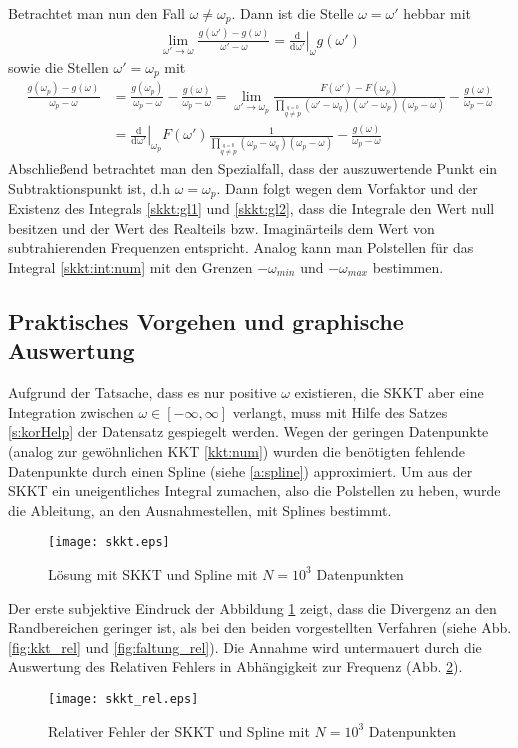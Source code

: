 Betrachtet man nun den Fall $\omega \neq \omega_p$. Dann ist die Stelle $\omega = \omega'$ hebbar mit
\begin{align}
\lim_{\omega' \rightarrow \omega}  \frac{g(\omega') - g(\omega)}{\omega' - \omega} =  \left. \frac{\mathrm{d}}{\mathrm{d\omega'}}\right|_{\omega} g(\omega') 
\end{align}
sowie die Stellen $\omega' = \omega_p$ mit
\begin{align}
	 \frac{g(\omega_p) - g(\omega)}{\omega_p - \omega} &= \frac{g(\omega_p)}{\omega_p - \omega} - \frac{g(\omega)}{\omega_p - \omega} =  \lim_{\omega' \rightarrow \omega_p} \frac{F(\omega') - F(\omega_p)}{\prod_{\stackrel{q = 0}{q \neq p}} (\omega' - \omega_q) (\omega' - \omega_p) (\omega_p - \omega)} - \frac{g(\omega)}{\omega_p - \omega}\\
	 &= \left.\frac{\mathrm{d}}{\mathrm{d\omega'}} \right|_{\omega_p} F(\omega') \frac{1}{\prod_{\stackrel{q = 0}{q \neq p}} (\omega_p - \omega_q) (\omega_p - \omega)} - \frac{g(\omega)}{\omega_p - \omega}
\end{align}
Abschließend betrachtet man den Spezialfall, dass der auszuwertende Punkt ein Subtraktionspunkt ist, d.h $\omega  = \omega_p$.
Dann folgt wegen dem Vorfaktor und der Existenz des Integrals \ref{skkt:gl1} und \ref{skkt:gl2}, dass die Integrale den Wert null besitzen und der Wert des Realteils bzw. Imaginärteils dem Wert von subtrahierenden Frequenzen entspricht. 
Analog kann man Polstellen für das Integral \ref{skkt:int:num} mit den Grenzen $-\omega_{min}$ und $-\omega_{max}$ bestimmen.
\subsection{Praktisches Vorgehen und graphische Auswertung}\label{num:skkt:prak}
Aufgrund der Tatsache, dass es nur positive $\omega$ existieren, die SKKT aber eine Integration zwischen $\omega \in [-\infty, \infty]$ verlangt, muss mit Hilfe des Satzes \ref{s:korHelp} der Datensatz gespiegelt werden. Wegen der geringen Datenpunkte (analog zur gewöhnlichen KKT  \ref{kkt:num}) wurden die benötigten fehlende Datenpunkte durch einen Spline (siehe \ref{a:spline}) approximiert. Um aus der SKKT ein uneigentliches Integral zumachen, also die Polstellen zu heben, wurde die Ableitung, an den Ausnahmestellen, mit Splines bestimmt. 
\begin{figure}[h]
	\texttt{[image: skkt.eps]}
	\caption{Lösung mit SKKT und Spline mit $N = 10^3$ Datenpunkten}
	\label{fig:skkt}
\end{figure}
Der erste subjektive Eindruck der Abbildung \ref{fig:skkt} zeigt, dass die Divergenz an den Randbereichen geringer ist, als bei den beiden vorgestellten Verfahren (siehe Abb. \ref{fig:kkt_rel} und \ref{fig:faltung_rel}). Die Annahme wird untermauert durch die Auswertung des Relativen Fehlers in Abhängigkeit zur Frequenz (Abb. \ref{fig:skkt_rel}).
\begin{figure}[h]
	\texttt{[image: skkt\_rel.eps]}
	\caption{Relativer Fehler der SKKT und Spline mit $N = 10^3$ Datenpunkten}
	\label{fig:skkt_rel}
\end{figure}
\newpage
